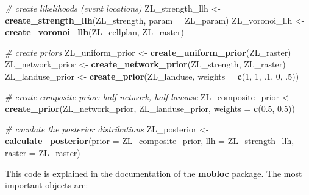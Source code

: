 \documentclass[
]{article}
\newenvironment{Shaded}{\begin{snugshade}}{\end{snugshade}}
\newcommand{\CommentTok}[1]{\textcolor[rgb]{0.56,0.35,0.01}{\textit{#1}}}
\newcommand{\DataTypeTok}[1]{\textcolor[rgb]{0.13,0.29,0.53}{#1}}
\newcommand{\DecValTok}[1]{\textcolor[rgb]{0.00,0.00,0.81}{#1}}
\newcommand{\FloatTok}[1]{\textcolor[rgb]{0.00,0.00,0.81}{#1}}
\newcommand{\KeywordTok}[1]{\textcolor[rgb]{0.13,0.29,0.53}{\textbf{#1}}}
\newcommand{\NormalTok}[1]{#1}
\newcommand{\StringTok}[1]{\textcolor[rgb]{0.31,0.60,0.02}{#1}}
\begin{document}
\begin{Shaded}
\begin{Highlighting}[]
\CommentTok{# create likelihoods (event locations)}
\NormalTok{ZL_strength_llh <-}\StringTok{ }\KeywordTok{create_strength_llh}\NormalTok{(ZL_strength, }\DataTypeTok{param =}\NormalTok{ ZL_param)}
\NormalTok{ZL_voronoi_llh <-}\StringTok{ }\KeywordTok{create_voronoi_llh}\NormalTok{(ZL_cellplan, ZL_raster)}

\CommentTok{# create priors}
\NormalTok{ZL_uniform_prior <-}\StringTok{ }\KeywordTok{create_uniform_prior}\NormalTok{(ZL_raster)}
\NormalTok{ZL_network_prior <-}\StringTok{ }\KeywordTok{create_network_prior}\NormalTok{(ZL_strength, ZL_raster)}
\NormalTok{ZL_landuse_prior <-}\StringTok{ }\KeywordTok{create_prior}\NormalTok{(ZL_landuse, }\DataTypeTok{weights =} \KeywordTok{c}\NormalTok{(}\DecValTok{1}\NormalTok{, }\DecValTok{1}\NormalTok{, }\FloatTok{.1}\NormalTok{, }\DecValTok{0}\NormalTok{, }\FloatTok{.5}\NormalTok{))}

\CommentTok{# create composite prior: half network, half lansuse}
\NormalTok{ZL_composite_prior <-}\StringTok{ }\KeywordTok{create_prior}\NormalTok{(ZL_network_prior, ZL_landuse_prior, }\DataTypeTok{weights =} \KeywordTok{c}\NormalTok{(}\FloatTok{0.5}\NormalTok{, }\FloatTok{0.5}\NormalTok{))}

\CommentTok{# caculate the posterior distributions}
\NormalTok{ZL_posterior <-}\StringTok{ }\KeywordTok{calculate_posterior}\NormalTok{(}\DataTypeTok{prior =}\NormalTok{ ZL_composite_prior, }
    \DataTypeTok{llh =}\NormalTok{ ZL_strength_llh, }\DataTypeTok{raster =}\NormalTok{ ZL_raster)}
\end{Highlighting}
\end{Shaded}

This code is explained in the documentation of the \textbf{mobloc}
package. The most important objects are:
\end{document}
